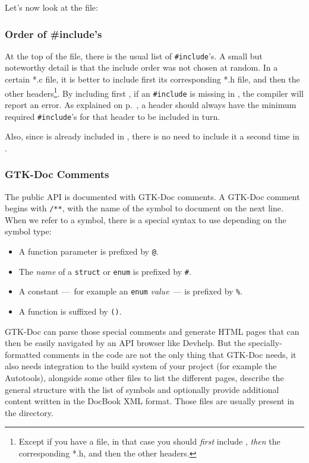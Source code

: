 Let's now look at the  file:

\vspace{0.7cm}


\subsubsection{Order of \#include's}
At the top of the file, there is the usual list of \lstinline{#include}'s. A small but noteworthy detail is that the include order was not chosen at random. In a certain *.c file, it is better to include first its corresponding *.h file, and then the other headers\footnote{Except if you have a  file, in that case you should \emph{first} include , \emph{then} the corresponding *.h, and then the other headers.}. By including first , if an \lstinline{#include} is missing in , the compiler will report an error. As explained on p.~\pageref{oop-include-in-header}, a header should always have the minimum required \lstinline{#include}'s for that header to be included in turn.

Also, since  is already included in , there is no need to include it a second time in .

\subsubsection{GTK-Doc Comments}
The public API is documented with GTK-Doc comments. A GTK-Doc comment begins with \lstinline{/**}, with the name of the symbol to document on the next line. When we refer to a symbol, there is a special syntax to use depending on the symbol type:
\begin{itemize}
  \item A function parameter is prefixed by \lstinline{@}.
  \item The \emph{name} of a \lstinline{struct} or \lstinline{enum} is prefixed by \lstinline{#}.
  \item A constant ---~for example an \lstinline{enum} \emph{value}~--- is prefixed by \lstinline{%}.
  \item A function is suffixed by \lstinline{()}.
\end{itemize}

GTK-Doc can parse those special comments and generate HTML pages that can then be easily navigated by an API browser like Devhelp. But the specially-formatted comments in the code are not the only thing that GTK-Doc needs, it also needs integration to the build system of your project (for example the Autotools), alongside some other files to list the different pages, describe the general structure with the list of symbols and optionally provide additional content written in the DocBook XML format. Those files are usually present in the  directory.

